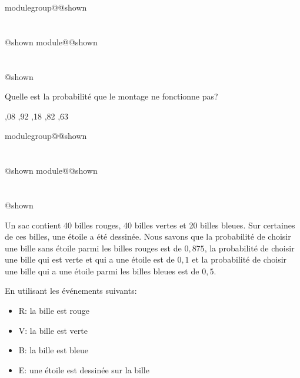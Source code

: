 \documentclass{Evaluation}
\makeatletter
\newcommand{\currentmodulekey}{}
\newcommand{\currentmoduletitle}{}
\newcommand{\currentgroupkey}{}
\newcommand{\currentgrouptitle}{}
\newcommand{\showmoduleifneeded}{%
  \ifx\currentgroupkey\empty\else
    \expandafter\ifx\csname modulegroup@\currentgroupkey @shown\endcsname\relax
      \section*{\currentgrouptitle}%
      \expandafter\gdef\csname modulegroup@\currentgroupkey @shown\endcsname{1}%
    \fi
  \fi
  \expandafter\ifx\csname module@\currentmodulekey @shown\endcsname\relax
    \section*{\currentmoduletitle}%
    \expandafter\gdef\csname module@\currentmodulekey @shown\endcsname{1}%
  \fi
}
\newenvironment{A25}{\showmoduleifneeded}{}
\newenvironment{H26}{\showmoduleifneeded}{}
\makeatother
\begin{document}
\begin{questions}
\begin{A25}
 Quelle est la probabilité que le montage ne fonctionne pas? 

 \begin{oneparcheckboxes}
		,08
		,92
		,18 
		,82
		,63
\end{oneparcheckboxes}
\end{A25}

\begin{H26}
\question {} %

Un sac contient 40 billes rouges, 40 billes vertes et 20 billes bleues.
Sur certaines de ces billes, une étoile a été dessinée.
Nous savons que la probabilité de choisir une bille sans étoile parmi les billes rouges est de $0,875$, la probabilité de choisir une bille qui est verte et qui a une étoile est de $0,1$ et la probabilité de choisir une bille qui a une étoile parmi les billes bleues est de $0,5$.

En utilisant les événements suivants:

\begin{itemize}
    \item R: la bille est rouge
    \item V: la bille est verte
    \item B: la bille est bleue
    \item E: une étoile est dessinée sur la bille
\end{itemize}

\end{H26}
\end{questions}
\end{document}
